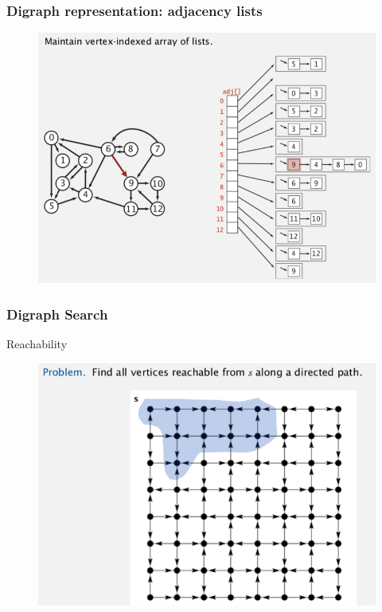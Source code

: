 \documentclass[11pt]{beamer}
\begin{document}
 \begin{frame}
	\frametitle	{Digraph representation: adjacency lists} 
    	\begin{figure}
    		\centering
    		\includegraphics[width=0.9\linewidth]{"Screenshot 2020-12-03 at 6.47.26 AM"}
    		\label{fig:screenshot-2020-12-03-at-6}
    	\end{figure} 	
\end{frame}

 \begin{frame}
	\frametitle	{Digraph Search} 
   	\alert{Reachability}
   	\begin{figure}
   		\centering
   		\includegraphics[width=0.8\linewidth]{"Screenshot 2020-12-03 at 6.50.31 AM"}
   		\label{fig:screenshot-2020-12-03-at-6}
   	\end{figure}	
\end{frame}
\end{document}
